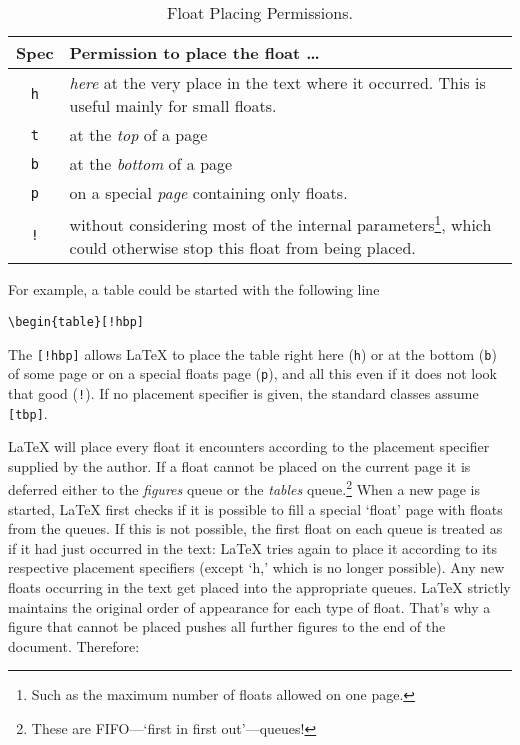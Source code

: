 \begin{table}[!bp]
\caption{Float Placing Permissions.}\label{tab:permiss}
\noindent \begin{minipage}{\textwidth}
\medskip
\begin{center}
\begin{tabular}{@{}cp{8cm}@{}}
Spec&Permission to place the float \ldots\\
\hline
\rule{0pt}{1.05em}\texttt{h} & \emph{here} at the very place in the text
  where it occurred.  This is useful mainly for small floats.\\[0.3ex]
\texttt{t} & at the \emph{top} of a page\\[0.3ex]
\texttt{b} & at the \emph{bottom} of a page\\[0.3ex]
\texttt{p} & on a special \emph{page} containing only floats.\\[0.3ex]
\texttt{!} & without considering most of the  internal parameters\footnote{Such as the
    maximum number of floats allowed  on one page.}, which could otherwise stop this
  float from being placed.
\end{tabular}
\end{center}
\end{minipage}
\end{table}

For example, a table could be started with the following line
\begin{code}
\verb|\begin{table}[!hbp]|
\end{code}
\noindent The  \verb|[!hbp]| allows \LaTeX{} to
place the table right here (\texttt{h}) or at the bottom (\texttt{b})
of some page
or on a special floats page (\texttt{p}), and all this even if it does not
look that good (\texttt{!}). If no placement specifier is given, the standard
classes assume \verb|[tbp]|.

\LaTeX{} will place every float it encounters according to the
placement specifier supplied by the author. If a float cannot be
placed on the current page it is deferred either to the
\emph{figures} queue or the \emph{tables} queue.\footnote{These are FIFO---`first in first out'---queues!}  When a new page is started,
\LaTeX{} first checks if it is possible to fill a special `float'
page with floats from the queues. If this is not possible, the first
float on each queue is treated as if it had just occurred in the
text: \LaTeX{} tries again to place it according to its
respective placement specifiers (except `h,' which is no longer
possible).  Any new floats occurring in the text get placed into the
appropriate queues. \LaTeX{} strictly maintains the original order of
appearance for each type of float. That's why a figure that cannot
be placed pushes all further figures to the end of the document.
Therefore:


